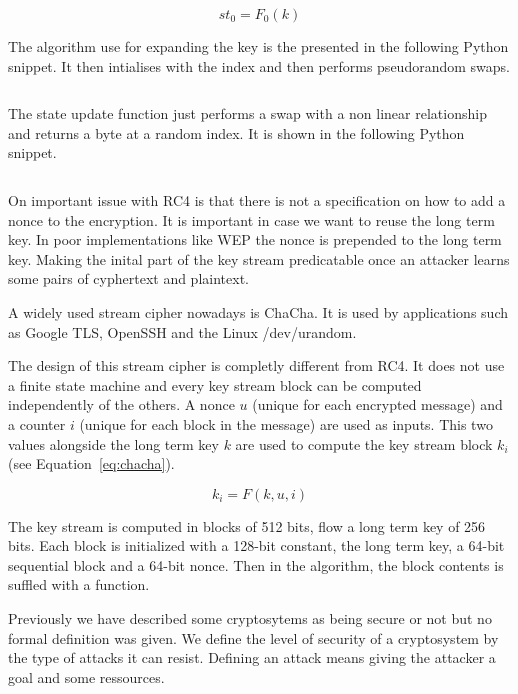 \begin{equation}
st_0 = F_0(k)
\label{eq:rc4_F0}
\end{equation}

The algorithm use for expanding the key is the presented in the following Python snippet.
It then intialises with the index and then performs pseudorandom swaps.

\inputminted{python}{src/rc4-init.py}

The state update function just performs a swap with a non linear relationship and returns a byte at a random index. 
It is shown in the following Python snippet.

\inputminted{python}{src/rc4.py}

On important issue with RC4 is that there is not a specification on how to add a nonce to the encryption.
It is important in case we want to reuse the long term key.
In poor implementations like WEP the nonce is prepended to the long term key.
Making the inital part of the key stream predicatable once an attacker learns some pairs of cyphertext and plaintext.

A widely used stream cipher nowadays is ChaCha.
It is used by applications such as Google TLS, OpenSSH and the Linux /dev/urandom.

The design of this stream cipher is completly different from RC4.
It does not use a finite state machine and every key stream block can be computed independently of the others.
A nonce $u$ (unique for each encrypted message) and a counter $i$ (unique for each block in the message) are used as inputs.
This two values alongside the long term key $k$ are used to compute the key stream block $k_i$ (see Equation~\ref{eq:chacha}).

\begin{equation}
  k_i = F(k, u, i)
  \label{eq:chacha}
\end{equation}

The key stream is computed in blocks of 512 bits, flow a long term key of 256 bits.
Each block is initialized with a 128-bit constant, the long term key, a 64-bit sequential block and a 64-bit nonce.
Then in the algorithm, the block contents is suffled with a function.

Previously we have described some cryptosytems as being secure or not but no formal definition was given.
We define the level of security of a cryptosystem by the type of attacks it can resist.
Defining an attack means giving the attacker a goal and some ressources.

